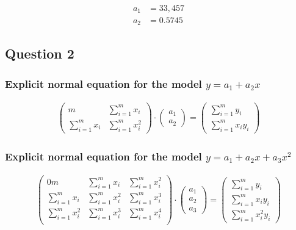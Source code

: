 \begin{equation}
	\begin{aligned}    
		a_1 &= 33,457\\
		a_2 &= 0.5745
	\end{aligned}
\end{equation}

\subsection{Question 2}

\subsubsection{Explicit normal equation for the model $y = a_1 + a_2x$}

\begin{equation}
	\begin{aligned}
		\begin{pmatrix}
			m & \displaystyle\sum_{i=1}^{m} x_i\\
			\displaystyle\sum_{i=1}^{m} x_i & \displaystyle\sum_{i=1}^{m} x_i^2
		\end{pmatrix}
		\cdot
		\begin{pmatrix}
			a_1\\
			a_2
		\end{pmatrix}=
		\begin{pmatrix}
			\displaystyle\sum_{i=1}^{m} y_i\\
			\displaystyle\sum_{i=1}^{m} x_iy_i
		\end{pmatrix}
	\end{aligned}
\end{equation}

\subsubsection{Explicit normal equation for the model $y = a_1 + a_2x + a_3x^2$}

\begin{equation}
	\begin{aligned}
		\begin{pmatrix}
			0m & \displaystyle\sum_{i=1}^{m} x_i & \displaystyle\sum_{i=1}^{m} x_i^2\\
			\displaystyle\sum_{i=1}^{m} x_i & \displaystyle\sum_{i=1}^{m} x_i^2 & \displaystyle\sum_{i=1}^{m} x_i^3\\
			\displaystyle\sum_{i=1}^{m} x_i^2 & \displaystyle\sum_{i=1}^{m} x_i^3 & \displaystyle\sum_{i=1}^{m} x_i^4\\
		\end{pmatrix}
		\cdot
		\begin{pmatrix}
			a_1\\
			a_2\\
			a_3
		\end{pmatrix}=
		\begin{pmatrix}
			\displaystyle\sum_{i=1}^{m} y_i\\
			\displaystyle\sum_{i=1}^{m} x_iy_i\\
			\displaystyle\sum_{i=1}^{m} x_i^2y_i
		\end{pmatrix}
	\end{aligned}
\end{equation}


